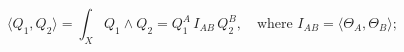 \begin{equation} \label{intproddef}
 \langle Q_1,Q_2 \rangle = \int_X Q_1 \wedge
Q_2
= Q_1^A \, I_{AB} \, Q_2^B , \quad \mbox{where } I_{AB} = \langle \Theta_A,\Theta_B \rangle;
\end{equation}

